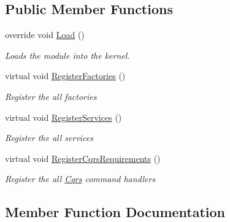 \subsection*{Public Member Functions}
\begin{DoxyCompactItemize}
\item 
override void \hyperlink{classCqrs_1_1Ninject_1_1MongoDB_1_1Configuration_1_1MongoDbEventStoreModule_aafdbd906511857f65cbd0789d458be18}{Load} ()
\begin{DoxyCompactList}\small\item\em Loads the module into the kernel. \end{DoxyCompactList}\item 
virtual void \hyperlink{classCqrs_1_1Ninject_1_1MongoDB_1_1Configuration_1_1MongoDbEventStoreModule_a32cbf7060777484eb68c4dc032109e6c}{Register\+Factories} ()
\begin{DoxyCompactList}\small\item\em Register the all factories \end{DoxyCompactList}\item 
virtual void \hyperlink{classCqrs_1_1Ninject_1_1MongoDB_1_1Configuration_1_1MongoDbEventStoreModule_abbb71b43dadafb70410ef2ff491f5108}{Register\+Services} ()
\begin{DoxyCompactList}\small\item\em Register the all services \end{DoxyCompactList}\item 
virtual void \hyperlink{classCqrs_1_1Ninject_1_1MongoDB_1_1Configuration_1_1MongoDbEventStoreModule_aec046bc34e4aaf11a0cae5ebb2bb6db1}{Register\+Cqrs\+Requirements} ()
\begin{DoxyCompactList}\small\item\em Register the all \hyperlink{namespaceCqrs}{Cqrs} command handlers \end{DoxyCompactList}\end{DoxyCompactItemize}


\subsection{Member Function Documentation}
\mbox{\label{classCqrs_1_1Ninject_1_1MongoDB_1_1Configuration_1_1MongoDbEventStoreModule_aafdbd906511857f65cbd0789d458be18}} 
